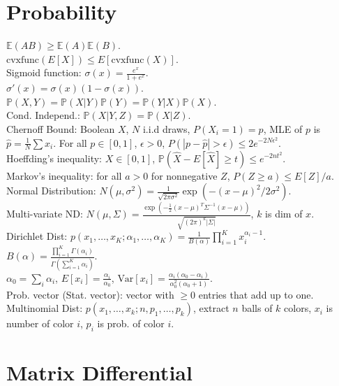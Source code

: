 \section{Probability}

$\mathbb{E}(AB) \geq \mathbb{E}(A)\mathbb{E}(B)$.\\
$\text{cvxfunc}(E[X]) \leq E[\text{cvxfunc}(X)]$.\\
Sigmoid function: $\sigma(x) = \frac{e^x}{1+e^x}$.\\
$\sigma'(x) = \sigma(x)(1-\sigma(x))$.\\
$\mathbb{P}(X, Y) = \mathbb{P}(X|Y)\mathbb{P}(Y) = \mathbb{P}(Y|X)\mathbb{P}(X)$.\\
Cond. Independ.: $\mathbb{P}(X|Y, Z) = \mathbb{P}(X|Z)$.\\
Chernoff Bound: Boolean $X$, $N$ i.i.d draws, $P(X_i=1)=p$, MLE of $p$ is $\hat{p}=\frac{1}{N}\sum x_i$. For all $p \in [0, 1]$, $\epsilon > 0$, $P(|p-\hat{p}| > \epsilon) \leq 2e^{-2N\epsilon^2}$.\\
Hoeffding's inequality: $X \in [0, 1]$, $\mathbb{P}(\hat{X} - E[\hat{X}] \geq t) \leq e^{-2nt^2}$.\\
Markov's inequality: for all $a > 0$ for nonnegative $Z$, $P(Z \geq a) \leq E[Z]/a$.\\
Normal Distribution: $N(\mu, \sigma^2) = \frac{1}{\sqrt{2 \pi \sigma^2}}\exp(-(x-\mu)^2/2\sigma^2)$.\\
Multi-variate ND: $N(\mu, \Sigma) = \frac{\exp(-\frac{1}{2}(x-\mu)^T\Sigma^{-1}(x-\mu))}{\sqrt{(2\pi)^k |\Sigma|}}$, $k$ is dim of $x$.\\
Dirichlet Dist: $p(x_1, \dots, x_K; \alpha_1, \dots, \alpha_K)=\frac{1}{B(\alpha)}\prod_{i=1}^K x_i^{\alpha_i - 1}$.\\
$B(\alpha) = \frac{\prod_{i=1}^K\Gamma(\alpha_i)}{\Gamma(\sum_{i=1}^K\alpha_i)}$.\\
$\alpha_0 = \sum_i \alpha_i$, $E[x_i]= \frac{\alpha_i}{\alpha_0}$, $\text{Var}[x_i] = \frac{\alpha_i(\alpha_0-\alpha_i)}{\alpha_0^2(\alpha_0+1)}$.\\
Prob. vector (Stat. vector): vector with $\geq 0$ entries that add up to one.\\
Multinomial Dist: $p(x_1, \dots, x_k; n, p_1, \dots, p_k)$, extract $n$ balls of $k$ colors, $x_i$ is number of color $i$, $p_i$ is prob. of color $i$.

\section{Matrix Differential}

